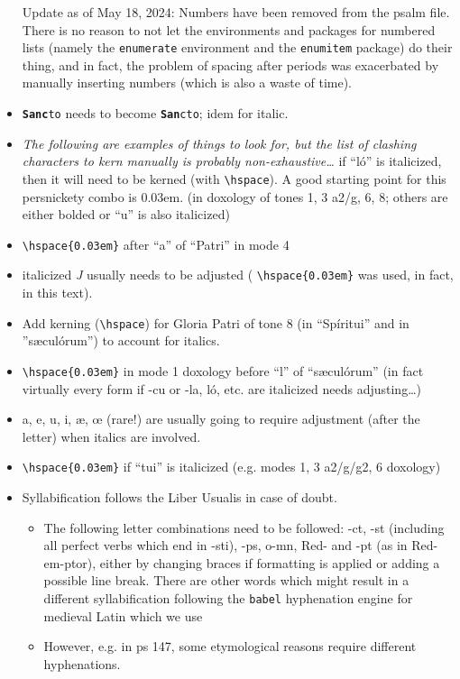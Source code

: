 \documentclass[11pt]{article}
\begin{document}
\begin{itemize}
 Update as of May 18, 2024: Numbers have been removed from the psalm file. There is no reason to not let the environments and packages for numbered lists (namely the \verb|enumerate| environment and the \verb|enumitem| package) do their thing, and in fact, the problem of spacing after periods was exacerbated by manually inserting numbers (which is also a waste of time).
 \item \texttt{\textbf{Sanc}to} needs to become \texttt{\textbf{San}cto}; idem for italic.
 \item \emph{The following are examples of things to look for, but the list of clashing characters to kern manually is probably non-exhaustive…}
 if ``ló'' is italicized, then it will need to be kerned (with \verb|\hspace|). A good starting point for this persnickety combo is 0.03em. (in doxology of tones 1, 3 a2/g, 6, 8; others are either bolded or ``u'' is also italicized)
  \item \verb|\hspace{0.03em}| after ``a'' of ``Patri'' in mode 4
  \item italicized \hspace{0.03em}\textit{J} usually needs to be adjusted ( \verb|\hspace{0.03em}| was used, in fact, in this text).
  \item
  Add kerning (\verb|\hspace|) for Gloria Patri of tone 8 (in ``Spíritui'' and in ''sæculórum'') to account for italics.
   \item  \verb|\hspace{0.03em}| in mode 1 doxology before ``l'' of ``sæculórum'' (in fact virtually every form if -cu or -la, ló, etc. are italicized needs adjusting…)
   \item a, e, u, i, æ, œ (rare!) are usually going to require adjustment (after the letter) when italics are involved.
   \item  \verb|\hspace{0.03em}| if ``tui'' is italicized (e.g. modes 1, 3 a2/g/g2, 6 doxology)
   \item
   Syllabification follows the Liber Usualis in case of doubt.
   \begin{itemize}
   \item
  The following letter combinations need to be followed: -ct, -st (including all perfect verbs which end in -sti), -ps, o-mn, Red- and -pt (as in Red-em-ptor), either by changing braces if formatting is applied or adding a possible line break. There are other words which might result in a different syllabification following the \verb|babel| hyphenation engine for medieval Latin which we use
  \item However, e.g. in ps 147, some etymological reasons require different hyphenations.
\end{itemize}
\end{itemize}
\end{document}
